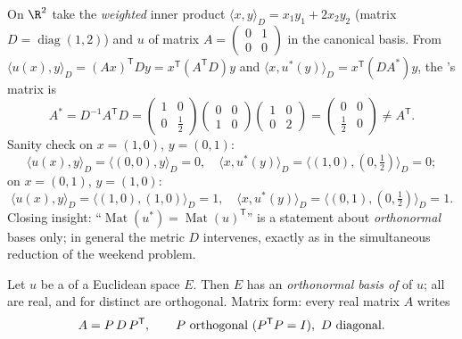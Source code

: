 \begin{example}\label{ex:b2:quadratic:weightedadjoint}
On $\R^2$ take the \emph{weighted} inner product $\langle x,
y\rangle_D = x_1y_1 + 2x_2y_2$ (matrix $D =
\operatorname{diag}(1,2)$) and $u$ of matrix $A =
\begin{pmatrix} 0 & 1\\ 0 & 0\end{pmatrix}$ in the canonical
basis. From $\langle u(x), y\rangle_D = (Ax)^{\mathsf T}Dy =
x^{\mathsf T}(A^{\mathsf T}D)y$ and $\langle x, u^*(y)\rangle_D
= x^{\mathsf T}(DA^*)y$, the 's matrix is
\[
A^* = D^{-1}A^{\mathsf T}D
= \begin{pmatrix} 1 & 0\\ 0 & \tfrac12\end{pmatrix}
\begin{pmatrix} 0 & 0\\ 1 & 0\end{pmatrix}
\begin{pmatrix} 1 & 0\\ 0 & 2\end{pmatrix}
= \begin{pmatrix} 0 & 0\\ \tfrac12 & 0\end{pmatrix}
\neq A^{\mathsf T} .
\]
Sanity check on $x = (1,0)$, $y = (0,1)$:
\[
\langle u(x), y\rangle_D = \langle (0,0), y\rangle_D = 0,
\quad
\langle x, u^*(y)\rangle_D
= \langle(1,0), (0,\tfrac12)\rangle_D = 0 ;
\]
on $x = (0,1)$, $y = (1,0)$:
\[
\langle u(x), y\rangle_D = \langle(1,0),(1,0)\rangle_D = 1,
\quad
\langle x, u^*(y)\rangle_D =
\langle(0,1),(0,\tfrac12)\rangle_D = 1 .
\] Closing insight: ``$\operatorname{Mat}(u^*)
= \operatorname{Mat}(u)^{\mathsf T}$'' is a statement about
\emph{orthonormal} bases only; in general the metric $D$
intervenes, exactly as in the simultaneous reduction of the
weekend problem.
\end{example}

\begin{theorem}\label{thm:b2:quadratic:spectral}
Let $u$ be a  of a Euclidean space $E$. Then
$E$ has an \emph{orthonormal basis of } of $u$; all
 are real, and  for distinct  are
orthogonal. Matrix form: every real  matrix $A$ writes
\[
A = P\,D\,P^{\mathsf T},
\qquad P \text{ orthogonal } (P^{\mathsf T} P = I),\ D
\text{ diagonal}.\index{spectral theorem}
\]
\end{theorem}

